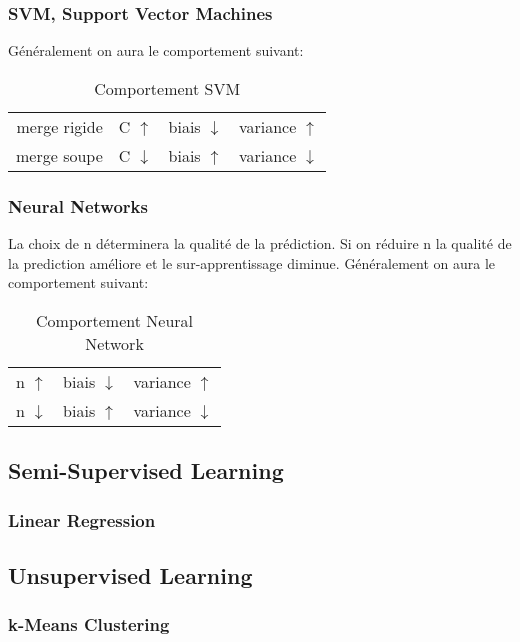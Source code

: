 \documentclass{article}
\begin{document}
\subsubsection{SVM, Support Vector Machines}
Généralement on aura le comportement suivant:
\begin{table}[H]
    \centering\begin{tabular}{rlll}
        merge rigide & C $\uparrow$   & biais $\downarrow$ & variance $\uparrow$\\
        merge soupe  & C $\downarrow$ & biais $\uparrow  $ & variance $\downarrow$\\
    \end{tabular}
    \caption{Comportement SVM}
\end{table}

\subsubsection{Neural Networks}
La choix de n déterminera la qualité de la prédiction. Si on réduire n la qualité de la prediction améliore et le sur-apprentissage diminue. Généralement on aura le comportement suivant:
\begin{table}[H]
    \centering\begin{tabular}{lll}
        n $\uparrow$   & biais $\downarrow$ & variance $\uparrow$\\
        n $\downarrow$ & biais $\uparrow  $ & variance $\downarrow$\\
    \end{tabular}
    \caption{Comportement Neural Network}
\end{table}

\subsection{Semi-Supervised Learning}
\subsubsection{Linear Regression}

\subsection{Unsupervised Learning}
\subsubsection{k-Means Clustering}
\end{document}
